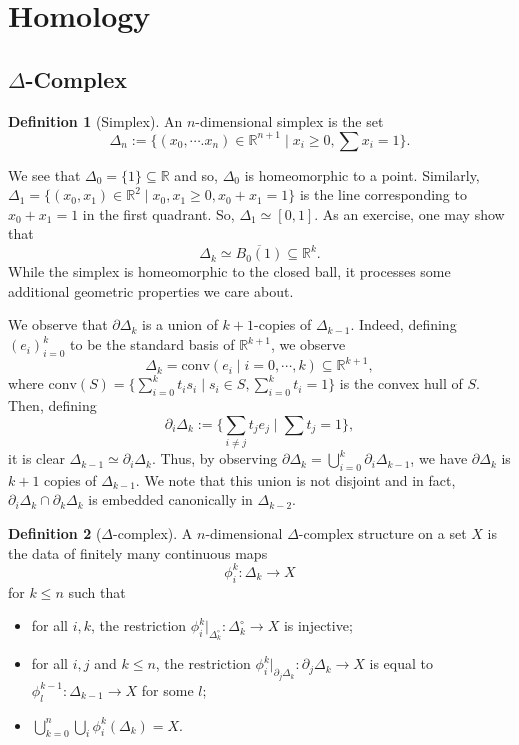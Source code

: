 \documentclass[]{article}
\theoremstyle{definition}
\theoremstyle{definition}
\newtheorem{definition}{Definition}[section]
\begin{document}
\newpage
\section{Homology}

\subsection{\texorpdfstring{\(\Delta\)}--Complex}

\begin{definition}[Simplex]
  An \(n\)-dimensional simplex is the set 
  \[\Delta_n := \{(x_0, \cdots. x_n) \in \mathbb{R}^{n + 1} \mid x_i \ge 0, \sum x_i = 1\}.\]
\end{definition}

We see that \(\Delta_0 = \{1\} \subseteq \mathbb{R}\) and so, \(\Delta_0\) is 
homeomorphic to a point. Similarly, 
\(\Delta_1 = \{(x_0, x_1) \in \mathbb{R}^2 \mid x_0, x_1 \ge 0, x_0 + x_1 = 1\}\)
is the line corresponding to \(x_0 + x_1 = 1\) in the first quadrant. So, 
\(\Delta_1 \simeq [0, 1]\). As an exercise, one may show that 
\[\Delta_k \simeq \overline{B_0(1)} \subseteq \mathbb{R}^k.\]
While the simplex is homeomorphic to the closed ball, it processes some additional 
geometric properties we care about.  

We observe that \(\partial \Delta_k\) is a union of \(k + 1\)-copies of 
\(\Delta_{k - 1}\). Indeed, defining \((e_i)_{i = 0}^k\) to be the standard basis 
of \(\mathbb{R}^{k + 1}\), we observe 
\[\Delta_k = \text{conv}(e_i \mid i = 0, \cdots, k) \subseteq \mathbb{R}^{k + 1},\]
where \(\text{conv}(S) = \{\sum_{i = 0}^k t_i s_i \mid s_i \in S, \sum_{i = 0}^k t_i = 1\}\) 
is the convex hull of \(S\). Then, defining 
\[\partial_i \Delta_k := \{\sum_{i \neq j} t_j e_j \mid \sum t_j = 1\},\]
it is clear \(\Delta_{k - 1} \simeq \partial_i \Delta_k\). Thus, by observing 
\(\partial \Delta_k = \bigcup_{i = 0}^{k} \partial_i \Delta_{k - 1}\), we have 
\(\partial \Delta_k\) is \(k + 1\) copies of \(\Delta_{k - 1}\). We note that 
this union is not disjoint and in fact, 
\(\partial_i \Delta_k \cap \partial_k \Delta_k\) is embedded canonically in 
\(\Delta_{k - 2}\).

\begin{definition}[\(\Delta\)-complex]
  A \(n\)-dimensional \(\Delta\)-complex structure on a set \(X\) is 
  the data of finitely many continuous maps 
  \[\phi_i^k : \Delta_k \to X\]
  for \(k \le n\) such that 
  \begin{itemize}
    \item for all \(i, k\), the restriction
      \(\phi_i^k|_{\Delta_k^\circ} : \Delta_k^\circ \to X\) is injective; 
    \item for all \(i, j\) and \(k \le n\), the restriction 
      \(\phi_i^k|_{\partial_j \Delta_k} : \partial_j \Delta_k \to X\) is equal 
      to \(\phi^{k - 1}_l : \Delta_{k - 1} \to X\) for some \(l\); 
    \item \(\bigcup_{k = 0}^n \bigcup_{i} \phi_i^k(\Delta_k) = X\).
  \end{itemize}
\end{definition}
\end{document}
